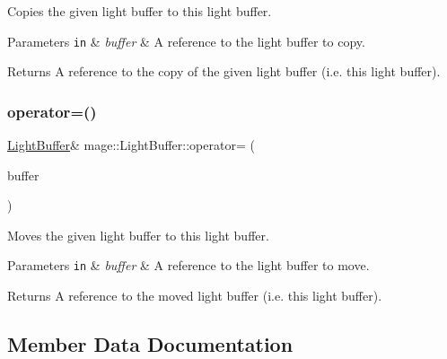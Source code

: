 Copies the given light buffer to this light buffer.


\begin{DoxyParams}[1]{Parameters}
\mbox{\tt in}  & {\em buffer} & A reference to the light buffer to copy. \\
\hline
\end{DoxyParams}
\begin{DoxyReturn}{Returns}
A reference to the copy of the given light buffer (i.\+e. this light buffer). 
\end{DoxyReturn}
\hypertarget{structmage_1_1_light_buffer_a7a41e25c173b24a643e6a82a382c3c35}{}\label{structmage_1_1_light_buffer_a7a41e25c173b24a643e6a82a382c3c35} 
\subsubsection{\texorpdfstring{operator=()}{operator=()}\hspace{0.1cm}{\footnotesize\ttfamily [2/2]}}
{\footnotesize\ttfamily \hyperlink{structmage_1_1_light_buffer}{Light\+Buffer}\& mage\+::\+Light\+Buffer\+::operator= (\begin{DoxyParamCaption}\item[{\hyperlink{structmage_1_1_light_buffer}{Light\+Buffer} \&\&}]{buffer }\end{DoxyParamCaption})\hspace{0.3cm}{\ttfamily [default]}}

Moves the given light buffer to this light buffer.


\begin{DoxyParams}[1]{Parameters}
\mbox{\tt in}  & {\em buffer} & A reference to the light buffer to move. \\
\hline
\end{DoxyParams}
\begin{DoxyReturn}{Returns}
A reference to the moved light buffer (i.\+e. this light buffer). 
\end{DoxyReturn}


\subsection{Member Data Documentation}
\hypertarget{structmage_1_1_light_buffer_a3034d4800262c53628015e057eb45ba0}{}\label{structmage_1_1_light_buffer_a3034d4800262c53628015e057eb45ba0} 
